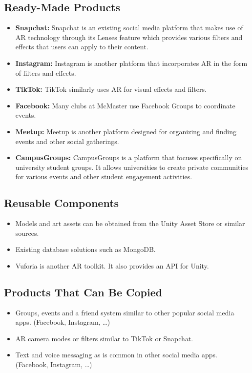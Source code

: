 \documentclass[12pt]{article}
\begin{document}
\subsection{Ready-Made Products}
\begin{itemize}
  \item \textbf{Snapchat:} Snapchat is an existing social media platform that makes use of AR technology through its Lenses feature which provides various filters and effects that users can apply to their content.
  \item \textbf{Instagram:} Instagram is another platform that incorporates AR in the form of filters and effects.
  \item \textbf{TikTok:} TikTok similarly uses AR for visual effects and filters.
  \item \textbf{Facebook:} Many clubs at McMaster use Facebook Groups to coordinate events.
  \item \textbf{Meetup:} Meetup is another platform designed for organizing and finding events and other social gatherings.
  \item \textbf{CampusGroups:} CampusGroups is a platform that focuses specifically on university student groups. It allows universities to create private communities for various events and other student engagement activities.
\end{itemize}
\subsection{Reusable Components}
\begin{itemize}
  \item Models and art assets can be obtained from the Unity Asset Store or similar sources.
  \item Existing database solutions such as MongoDB.
  \item Vuforia is another AR toolkit. It also provides an API for Unity.
\end{itemize}
\subsection{Products That Can Be Copied}
\begin{itemize}
  \item Groups, events and a friend system similar to other popular social media apps. (Facebook, Instagram, \dots)
  \item AR camera modes or filters similar to TikTok or Snapchat.
  \item Text and voice messaging as is common in other social media apps. (Facebook, Instagram, \dots)
\end{itemize}
\end{document}
